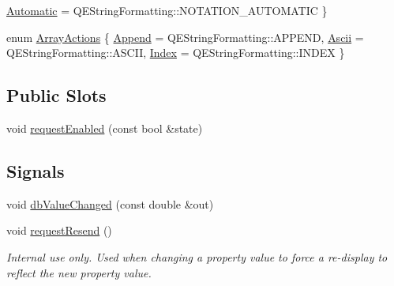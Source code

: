 \begin{DoxyCompactItemize}
\hyperlink{classQEAnalogProgressBar_ac1a7dd3ab8de2cb168bac300d43366bdafa3a8603d21988fe8c5c17fee725db1c}{Automatic} =  QEStringFormatting::NOTATION\_\-AUTOMATIC
 \}
\item 
enum \hyperlink{classQEAnalogProgressBar_a055aa4406d3d50b798c590156a245dc2}{ArrayActions} \{ \hyperlink{classQEAnalogProgressBar_a055aa4406d3d50b798c590156a245dc2a30423c1b15d44223f1a1e7397f64fdae}{Append} =  QEStringFormatting::APPEND, 
\hyperlink{classQEAnalogProgressBar_a055aa4406d3d50b798c590156a245dc2adb6addd55c779ec6c66d7f48ecf456ae}{Ascii} =  QEStringFormatting::ASCII, 
\hyperlink{classQEAnalogProgressBar_a055aa4406d3d50b798c590156a245dc2aa1cc807f1ec17b5404dca4d0e9a47112}{Index} =  QEStringFormatting::INDEX
 \}
\end{DoxyCompactItemize}
\subsection*{Public Slots}
\begin{DoxyCompactItemize}
\item 
void \hyperlink{classQEAnalogProgressBar_af4ce31af3de751da63b21015a7a58c97}{requestEnabled} (const bool \&state)
\end{DoxyCompactItemize}
\subsection*{Signals}
\begin{DoxyCompactItemize}
\item 
void \hyperlink{classQEAnalogProgressBar_aa1d6337e7487a508bb4e68e84e2a1784}{dbValueChanged} (const double \&out)
\item 
\hypertarget{classQEAnalogProgressBar_aa2fc4a277178235ceaff0b2f88b6b034}{
void \hyperlink{classQEAnalogProgressBar_aa2fc4a277178235ceaff0b2f88b6b034}{requestResend} ()}
\label{classQEAnalogProgressBar_aa2fc4a277178235ceaff0b2f88b6b034}

\begin{DoxyCompactList}\small\item\em Internal use only. Used when changing a property value to force a re-\/display to reflect the new property value. \end{DoxyCompactList}\end{DoxyCompactItemize}
